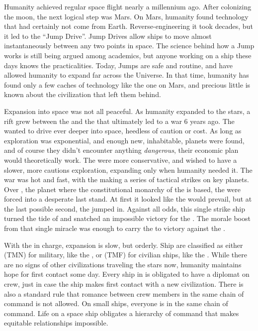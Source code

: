\documentclass[blue]{TMFHope}
\begin{document}
\name{\bHistory{}}

Humanity achieved regular space flight nearly a millennium ago. After colonizing the moon, the next logical step was Mars. On Mars, humanity found technology that had certainly not come from Earth. Reverse-engineering it took decades, but it led to the ``Jump Drive''. Jump Drives allow ships to move almost instantaneously between any two points in space. The science behind how a Jump works is still being argued among academics, but anyone working on a ship these days knows the practicalities.  Today, Jumps are safe and routine, and have allowed humanity to expand far across the Universe. In that time, humanity has found only a few caches of technology like the one on Mars, and precious little is known about the civilization that left them behind.

Expansion into space was not all peaceful. As humanity expanded to the stars, a rift grew between the \pPlan{} and the \pEdge{} that ultimately led to a war 6 years ago. The \pEdge{} wanted to drive ever deeper into space, heedless of caution or cost. As long as exploration was exponential, and enough new, inhabitable, planets were found, and of course they didn't encounter anything \emph{dangerous}, their economic plan would theoretically work. The \pPlan{} were more conservative, and wished to have a slower, more cautions exploration, expanding only when humanity needed it. The war was hot and fast, with the \pEdge{} making a series of tactical strikes on key \pPlan{} planets. Over \pHome{}, the planet where the constitutional monarchy of the \pPlan{} is based, the \pPlan{} were forced into a desperate last stand. At first it looked like the \pEdge{} would prevail, but at the last possible second, the \pOld{} jumped in. Against all odds, this single strike ship turned the tide of \pBattle{} and snatched an impossible victory for the \pPlan{}. The morale boost from that single miracle was enough to carry the \pPlan{} to victory against the \pEdge{}.

With the \pPlan{} in charge, expansion is slow, but orderly. Ship are classified as either \pTMN{} (TMN) for military, like the \pOld{}, or \pTMF{} (TMF) for civilian ships, like the \pNew{}. While there are no signs of other civilizations traveling the stars now, humanity maintains hope for first contact some day. Every ship in \pTMF{} is obligated to have a diplomat on crew, just in case the ship makes first contact with a new civilization. There is also a standard rule that romance between crew members in the same chain of command is not allowed. On small \pTMF{} ships, everyone is in the same chain of command. Life on a space ship obligates a hierarchy of command that makes equitable relationships impossible.
\end{document}
